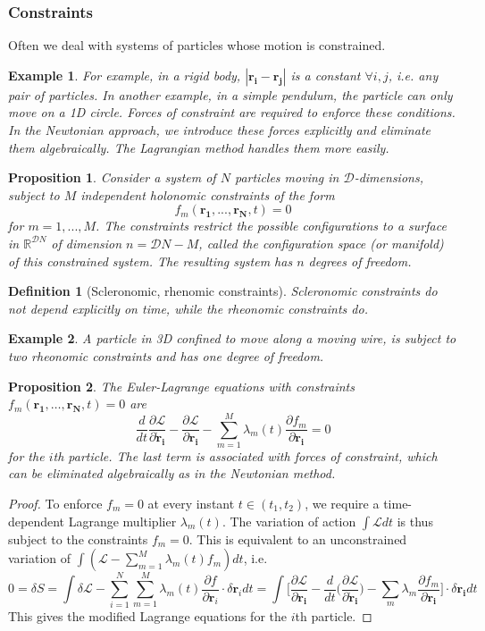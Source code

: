 \documentclass[a4paper]{article}
\newtheorem{eg}{Example}[section]
\theoremstyle{new}
\newtheorem{defi}{Definition}[section]
\newtheorem{prop}{Proposition}[section]
\begin{document}
\subsubsection{Constraints}
Often we deal with systems of particles whose motion is constrained. 
\begin{eg}
For example, in a rigid body, $|\mathbf{r_i}-\mathbf{r_j}|$ is a constant $\forall i,j$, i.e. any pair of particles. In another example, in a simple pendulum, the particle can only move on a 1D circle. Forces of constraint are required to enforce these conditions. In the Newtonian approach, we introduce these forces explicitly and eliminate them algebraically. The Lagrangian method handles them more easily.
\end{eg}
\begin{prop}
Consider a system of $N$ particles moving in $\mathcal{D}$-dimensions, subject to $M$ independent holonomic constraints of the form 
$$f_m(\mathbf{r_1},...,\mathbf{r_N},t)=0$$
for $m=1,...,M$. The constraints restrict the possible configurations to a surface in $\mathbb{R}^{\mathcal{D}N}$ of dimension $n=\mathcal{D}N-M$, called the configuration space (or manifold) of this constrained system. The resulting system has $n$ degrees of freedom.
\end{prop}
\begin{defi}[Scleronomic, rhenomic constraints]
Scleronomic constraints do not depend explicitly on time, while the rheonomic constraints do. 
\end{defi}
\begin{eg}
A particle in 3D confined to move along a moving wire, is subject to two rheonomic constraints and has one degree of freedom. 
\end{eg}
\begin{prop}
The Euler-Lagrange equations with constraints $f_m(\mathbf{r_1},\dots,\mathbf{r_N},t)=0$ are
$$\frac{d}{dt}\frac{\partial\mathcal{L}}{\partial\mathbf{\dot{r}_i}}-\frac{\partial\mathcal{L}}{\partial\mathbf{r_i}}-\sum_{m=1}^M\lambda_m(t)\frac{\partial f_m}{\partial\mathbf{r_i}}=0$$
for the $i$th particle. The last term is associated with forces of constraint, which can be eliminated algebraically as in the Newtonian method.
\end{prop}
\begin{proof}
To enforce $f_m=0$ at every instant $t\in(t_1,t_2)$, we require a time-dependent Lagrange multiplier $\lambda_m(t)$. The variation of action $\int\mathcal{L}dt$ is thus subject to the constraints $f_m=0$. This is equivalent to an unconstrained variation of $\int(\mathcal{L}-\sum_{m=1}^M\lambda_m(t)f_m)dt$, i.e.
$$0=\delta S=\int\delta\mathcal{L}-\sum_{i=1}^N\sum_{m=1}^M\lambda_m(t)\frac{\partial f}{\partial\mathbf{r}_i}\cdot\delta\mathbf{r}_idt=\int\bigg[\frac{\partial\mathcal{L}}{\partial \mathbf{r_i}}-\frac{d}{dt}\bigg(\frac{\partial\mathcal{L}}{\partial\mathbf{\dot{r}_i}}\bigg)-\sum_m\lambda_m\frac{\partial f_m}{\partial \mathbf{r_i}}\bigg]\cdot\delta\mathbf{r_i}dt$$
This gives the modified Lagrange equations for the $i$th particle. 
\end{proof}
\end{document}
